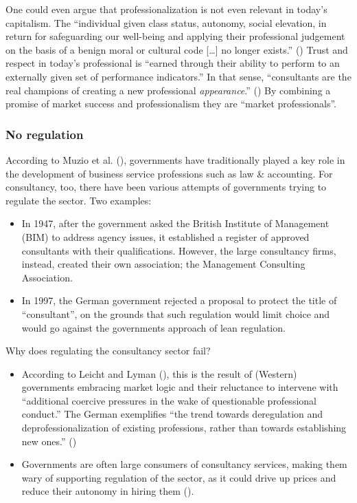 \documentclass[
  man,floatsintext]{apa6}
\begin{document}
One could even argue that professionalization is not even relevant in today's capitalism. The ``individual given class status, autonomy, social elevation, in return for safeguarding our well-being and applying their professional judgement on the basis of a benign moral or cultural code {[}\ldots{]} no longer exists.'' () Trust and respect in today's professional is ``earned through their ability to perform to an externally given set of performance indicators.'' In that sense, ``consultants are the real champions of creating a new professional \emph{appearance}.'' () By combining a promise of market success and professionalism they are ``market professionals''.

\subsubsection{No regulation}\label{no-regulation}

According to Muzio et al. (), governments have traditionally played a key role in the development of business service professions such as law \& accounting. For consultancy, too, there have been various attempts of governments trying to regulate the sector. Two examples:

\begin{itemize}
\item
  In 1947, after the government asked the British Institute of Management (BIM) to address agency issues, it established a register of approved consultants with their qualifications. However, the large consultancy firms, instead, created their own association; the Management Consulting Association.
\item
  In 1997, the German government rejected a proposal to protect the title of ``consultant'', on the grounds that such regulation would limit choice and would go against the governments approach of lean regulation.
\end{itemize}

Why does regulating the consultancy sector fail?

\begin{itemize}
\item
  According to Leicht and Lyman (), this is the result of (Western) governments embracing market logic and their reluctance to intervene with ``additional coercive pressures in the wake of questionable professional conduct.'' The German exemplifies ``the trend towards deregulation and deprofessionalization of existing professions, rather than towards establishing new ones.'' ()
\item
  Governments are often large consumers of consultancy services, making them wary of supporting regulation of the sector, as it could drive up prices and reduce their autonomy in hiring them ().
\end{itemize}
\end{document}
